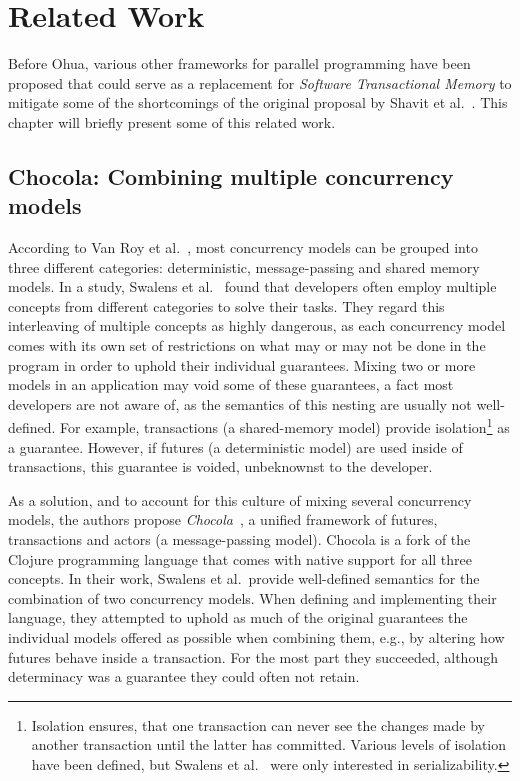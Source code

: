 %
\chapter{Related Work}%
\label{sec:related}

Before Ohua, various other frameworks for parallel programming have been proposed that could serve as a replacement for \emph{Software Transactional Memory} to mitigate some of the shortcomings of the original proposal by Shavit et al.~\cite{shavit1997software}.
This chapter will briefly present some of this related work.

\section{Chocola: Combining multiple concurrency models}%
\label{sec:related:chocola}
According to Van Roy et al.~\cite{van2004concepts}, most concurrency models can be grouped into three different categories: deterministic, message-passing and shared memory models.
In a study, Swalens et al.~\cite{swalens2018chocola} found that developers often employ multiple concepts from different categories to solve their tasks.
They regard this interleaving of multiple concepts as highly dangerous, as each concurrency model comes with its own set of restrictions on what may or may not be done in the program in order to uphold their individual guarantees.
Mixing two or more models in an application may void some of these guarantees, a fact most developers are not aware of, as the semantics of this nesting are usually not well-defined.
For example, transactions (a shared-memory model) provide isolation\footnote{Isolation ensures, that one transaction can never see the changes made by another transaction until the latter has committed. Various levels of isolation have been defined, but Swalens et al.~\cite{swalens2018chocola} were only interested in serializability.} as a guarantee.
However, if futures (a deterministic model) are used inside of transactions, this guarantee is voided, unbeknownst to the developer.

As a solution, and to account for this culture of mixing several concurrency models, the authors propose \emph{Chocola}~\cite{swalens2018chocola}, a unified framework of futures, transactions and actors (a message-passing model).
Chocola is a fork of the Clojure programming language that comes with native support for all three concepts.
In their work, Swalens et al.\ provide well-defined semantics for the combination of two concurrency models.
When defining and implementing their language, they attempted to uphold as much of the original guarantees the individual models offered as possible when combining them, e.g., by altering how futures behave inside a transaction.
For the most part they succeeded, although determinacy was a guarantee they could often not retain.

